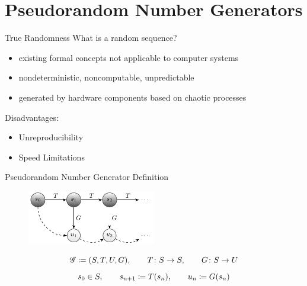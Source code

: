 \documentclass[aspectratio=169]{beamer}
\begin{document}
  \section{Pseudorandom Number Generators} %
  \label{sec:pseudorandom_number_generators}
    \begin{frame}{True Randomness}
      What is a random sequence?
      \pause
      \begin{itemize}
        \item existing formal concepts not applicable to computer systems
        \pause
        \item nondeterministic, noncomputable, unpredictable
        \pause
        \item generated by hardware components based on chaotic processes
      \end{itemize}

      \bigskip

      \pause
      Disadvantages:
      \pause
      \begin{itemize}
        \item Unreproducibility
        \pause
        \item Speed Limitations
      \end{itemize}
    \end{frame}

    \begin{frame}{Pseudorandom Number Generator Definition}
      \begin{figure}
        \includegraphics[width=0.5\textwidth]{figures/sequence_generation_scheme.pdf}
      \end{figure}
      \vfill
      \begin{mybox}
        \[
          \mathscr{G} \coloneqq (S,T,U,G),\qquad T\colon S\to S, \qquad G\colon S\to U
        \]
        \[
          s_0\in S, \qquad s_{n+1} \coloneqq T(s_n), \qquad u_n \coloneqq G(s_n)
        \]
      \end{mybox}
    \end{frame}
\end{document}
